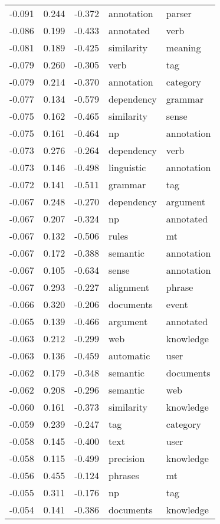 \begin{tabular}{cccp{5cm}p{5cm}}
-0.091 & 0.244 & -0.372 & annotation & parser \\
-0.086 & 0.199 & -0.433 & annotated & verb \\
-0.081 & 0.189 & -0.425 & similarity & meaning \\
-0.079 & 0.260 & -0.305 & verb & tag \\
-0.079 & 0.214 & -0.370 & annotation & category \\
-0.077 & 0.134 & -0.579 & dependency & grammar \\
-0.075 & 0.162 & -0.465 & similarity & sense \\
-0.075 & 0.161 & -0.464 & np & annotation \\
-0.073 & 0.276 & -0.264 & dependency & verb \\
-0.073 & 0.146 & -0.498 & linguistic & annotation \\
-0.072 & 0.141 & -0.511 & grammar & tag \\
-0.067 & 0.248 & -0.270 & dependency & argument \\
-0.067 & 0.207 & -0.324 & np & annotated \\
-0.067 & 0.132 & -0.506 & rules & mt \\
-0.067 & 0.172 & -0.388 & semantic & annotation \\
-0.067 & 0.105 & -0.634 & sense & annotation \\
-0.067 & 0.293 & -0.227 & alignment & phrase \\
-0.066 & 0.320 & -0.206 & documents & event \\
-0.065 & 0.139 & -0.466 & argument & annotated \\
-0.063 & 0.212 & -0.299 & web & knowledge \\
-0.063 & 0.136 & -0.459 & automatic & user \\
-0.062 & 0.179 & -0.348 & semantic & documents \\
-0.062 & 0.208 & -0.296 & semantic & web \\
-0.060 & 0.161 & -0.373 & similarity & knowledge \\
-0.059 & 0.239 & -0.247 & tag & category \\
-0.058 & 0.145 & -0.400 & text & user \\
-0.058 & 0.115 & -0.499 & precision & knowledge \\
-0.056 & 0.455 & -0.124 & phrases & mt \\
-0.055 & 0.311 & -0.176 & np & tag \\
-0.054 & 0.141 & -0.386 & documents & knowledge \\

\end{tabular}

